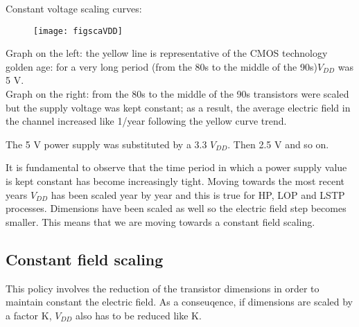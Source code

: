 \documentclass[a4paper, 12pt, twoside, openright]{report}
\begin{document}
Constant voltage scaling curves:

	\begin{figure}[H]
	\centering
	\texttt{[image: figscaVDD]}
	\caption{}
	\label{}
	\end{figure}

Graph on the left: the yellow line is representative of the CMOS technology golden age: for a very long period (from the 80s to the middle of the 90s)$ V_{DD}$ was 5 V.\\
Graph on the right: from the 80s to the middle of the 90s transistors were scaled but the supply voltage was kept constant; as a result, the average electric field in the channel increased like 1/year following the yellow curve trend.

The 5 V power supply was substituted by a 3.3 $V_{DD}$. Then 2.5 V and so on. 

It is fundamental to observe that the time period in which a power supply value is kept constant has become increasingly tight. Moving towards the most recent years $V_{DD}$ has been scaled year by year and this is true for HP, LOP and LSTP processes. Dimensions have been scaled as well so the electric field step becomes smaller. This means that we are moving towards a constant field scaling.

\newpage

\subsection{Constant field scaling}

This policy involves the reduction of the transistor dimensions in order to maintain constant the electric field. As a conseuqence, if dimensions are scaled by a factor K, $V_{DD}$ also has to be reduced like K.
\end{document}
